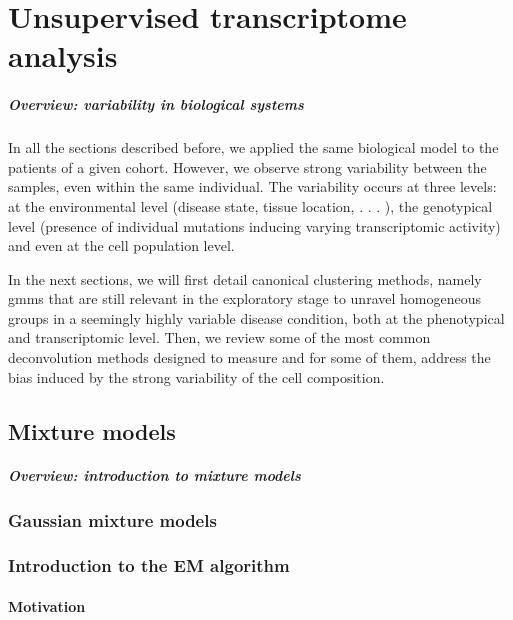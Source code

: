 \chapter{Unsupervised transcriptome analysis}

\paragraph{Overview: variability in biological systems}

In all the sections described before, we applied the same biological model to the patients of a given cohort. However, we observe strong variability between the samples, even within the same individual. The variability occurs at three levels: at the environmental level (disease state, tissue location, . . . ), the genotypical level (presence of individual mutations inducing varying transcriptomic activity) and even at the cell population level. 

In the next sections, we will first detail canonical clustering methods, namely \Glspl{gmm} that are still relevant in the exploratory stage to unravel homogeneous groups in a seemingly highly variable disease condition, both at the phenotypical and transcriptomic level. Then, we review some of the most common deconvolution methods designed to measure and for some of them, address the bias induced by the strong variability of the cell composition.



\section{Mixture models} 
\paragraph{Overview: introduction to mixture models}

\subsection{Gaussian mixture models}

\subsection{Introduction to the EM algorithm}
\subsubsection{Motivation}

